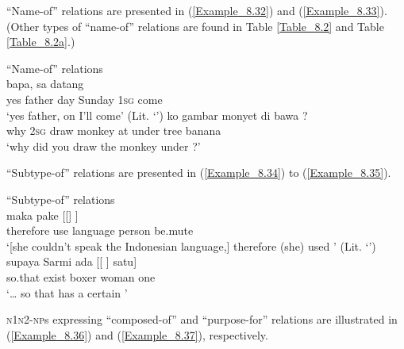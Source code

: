 ``Name-of'' relations are presented in (\ref{Example_8.32}) and (\ref{Example_8.33}). (Other types of ``name-of'' relations are found in Table \ref{Table_8.2} and Table \ref{Table_8.2a}.)




\ea 
``Name-of'' relations \\
\ea
\label{Example_8.32}
 {bapa,} {} {} {sa} {datang}\\ %
 yes  father  day  Sunday  \textsc{1sg}  come\\
\glt 
‘yes father, on  I’ll come’ (Lit. ‘’) \textstyleExampleSource{[080922-001a-CvPh.0344]}
\vspace{5pt}
\ex
\label{Example_8.33}
 {ko} {gambar} {monyet} {di} {bawa} {} {}?\\ %
 why  \textsc{2sg}  draw  monkey  at  under  tree  banana\\
\glt 
‘why did you draw the monkey under ?’ \textstyleExampleSource{[081109-002-JR.0004]}
\z
\z



``Subtype-of'' relations are presented in (\ref{Example_8.34}) to (\ref{Example_8.35}).


\ea 
``Subtype-of'' relations\\
\ea
\label{Example_8.34}
\gll {\ldots} {maka} {pake} {[[]} {} {]}\\ %
 { }  therefore  use  language  person  be.mute\\
\glt ‘[she couldn’t speak the Indonesian language,] therefore (she) used ’ (Lit. ‘’) \textstyleExampleSource{[081006-023-CvEx.0073]}
\vspace{5pt}
\ex
\label{Example_8.35}
\gll {\ldots} {supaya} {Sarmi} {ada} {[[} {]} {satu]}\\ %
 { }  so.that    exist  boxer  woman  one\\
\glt 
‘{\ldots} so that  has a certain ’ \textstyleExampleSource{[081023-003-Cv.0005]}
\z
\z


\textsc{n1n2-np}s expressing ``composed-of'' and ``purpose-for'' relations are illustrated in (\ref{Example_8.36}) and (\ref{Example_8.37}), respectively.




